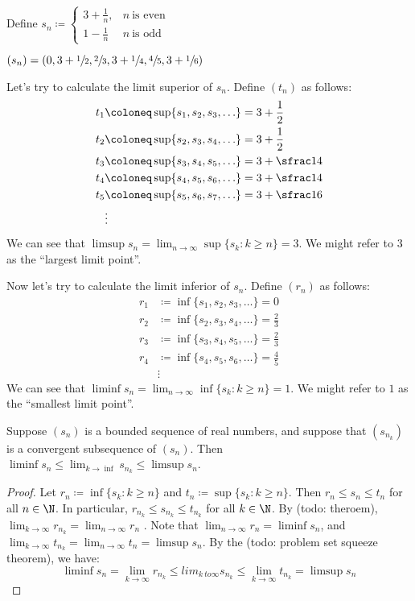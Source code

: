 \begin{exbox}{}{}
    Define $s_n \coloneq \begin{cases}
        3+\frac1n, & n\ \text{is even} \\
        1 - \frac1n & n\ \text{is odd}
    \end{cases}$

    $(s_n) = (0, 3 + \sfrac12, \sfrac23, 3 + \sfrac14, \sfrac45, 3 + \sfrac16)$

    Let's try to calculate the limit superior of $s_n$. Define $(t_n)$ as follows:
    \begin{align*}
        t_1 &\coloneq \sup\{s_1, s_2, s_3, \ldots\} = 3 + \frac12 \\
        t_2 &\coloneq \sup\{s_2, s_3, s_4, \ldots\} = 3 + \frac12 \\
        t_3 &\coloneq \sup\{s_3, s_4, s_5, \ldots\} = 3 + \sfrac14 \\
        t_4 &\coloneq \sup\{s_4, s_5, s_6, \ldots\} = 3 + \sfrac14 \\
        t_5 &\coloneq \sup\{s_5, s_6, s_7, \ldots\} = 3 + \sfrac16 \\
            &\vdots
    \end{align*}
    We can see that $\limsup s_n = \lim_{n \to \infty} \sup\{s_k : k \geq n\} = 3$. We might refer to $3$ as the ``largest limit point''.

    Now let's try to calculate the limit inferior of $s_n$. Define $(r_n)$  as follows:
    \begin{align*}
        r_1 &\coloneq \inf\{s_1, s_2, s_3, \ldots\} = 0 \\
        r_2 &\coloneq \inf\{s_2, s_3, s_4, \ldots\} = \frac23 \\
        r_3 &\coloneq \inf\{s_3, s_4, s_5, \ldots\} = \frac23 \\
        r_4 &\coloneq \inf\{s_4, s_5, s_6, \ldots\} = \frac45 \\
        &\vdots
    \end{align*}
    We can see that $\liminf s_n = \lim_{n \to \infty} \inf\{s_k : k \geq n\} = 1$. We might refer to $1$ as the ``smallest limit point''.
\end{exbox}

\begin{thmbox}{}{}
    Suppose $(s_n)$ is a bounded sequence of real numbers, and suppose that $(s_{n_k})$ is a convergent subsequence of $(s_n)$. Then $\liminf s_n \leq \lim_{k \to \inf} s_{n_k} \leq \limsup s_n$.
    \tcblower
    \begin{proof}
        Let $r_n \coloneq \inf\{s_k : k \geq n\}$ and $t_n \coloneq \sup\{s_k : k \geq n\}$. Then $r_n \leq s_n \leq t_n$ for all $n \in \N$. In particular, $r_{n_k} \leq s_{n_k} \leq t_{n_k}$ for all $k \in \N$. By (todo: theroem), $\lim_{k \to \infty} r_{n_k} = \lim_{n \to \infty} r_n$ . Note that $\lim_{n \to \infty} r_n = \liminf s_n$, and $\lim_{k \to \infty} t_{n_k} = \lim_{n \to \infty} t_n = \limsup s_n$. By the (todo: problem set squeeze theorem), we have:
        \[ \liminf s_n = \lim_{k \to \infty} r_{n_k} \leq lim_{k\ to \infty} s_{n_k} \leq \lim_{k \to \infty} t_{n_k} = \limsup s_n \]
    \end{proof}
\end{thmbox}

